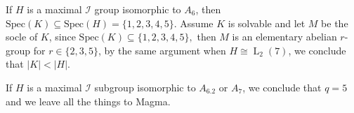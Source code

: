 \documentclass[12pt,reqno]{amsart}
\newcommand{\LL}{\operatorname{L}}
\theoremstyle{plain}
\theoremstyle{definition}
\begin{document}
   
   If $H$ is a maximal $\mathcal{I}$ group isomorphic to $A_6$, then $\mathrm{Spec}(K)\subseteq \mathrm{Spec}(H)=\{1,2,3,4,5\}$. 
   Assume $K$ is solvable and let $M$ be the socle of $K$, since $\mathrm{Spec}(K)\subseteq\{1,2,3,4,5\},$ then $M$ is an elementary abelian $r$-group for $r\in \{2,3,5\}$, by the same argument when $H\cong \LL_2(7)$, we conclude that $|K|<|H|$.
   
   If $H$ is a maximal $\mathcal{I}$ subgroup isomorphic to $A_6.2$ or $A_7$, we conclude that $q=5$ and we leave all the things to Magma.
  
 
\end{document}
